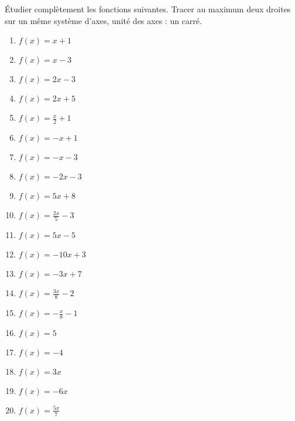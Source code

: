 \begin{exercice}
Étudier complètement les fonctions suivantes.
	Tracer au maximum deux droites sur un même système d'axes, unité des axes : un carré.
\begin{multicols}{3}
\begin{enumerate}
\item $f(x)=x+1$
\item $f(x)=x-3$
\item $f(x)=2x-3$
\item $f(x)=2x+5$ 
\item $f(x)=\frac{x}{2}+1$ 
\item $f(x)=-x+1$
\item $f(x)=-x-3$
\item $f(x)=-2x-3$
\item $f(x)=5x+8$
\item $f(x)=\frac{2x}{5}-3$
\item $f(x)=5x-5$
\item $f(x)=-10x+3$
\item $f(x)=-3x+7$
\item $f(x)=\frac{3x}{8}-2$
\item $f(x)=-\frac{x}{8}-1$
\item $f(x)=5$
\item $f(x)=-4$
\item $f(x)=3x$
\item $f(x)=-6x$
\item $f(x)=\frac{5x}{7}$
\end{enumerate}
\end{multicols}
\end{exercice}
